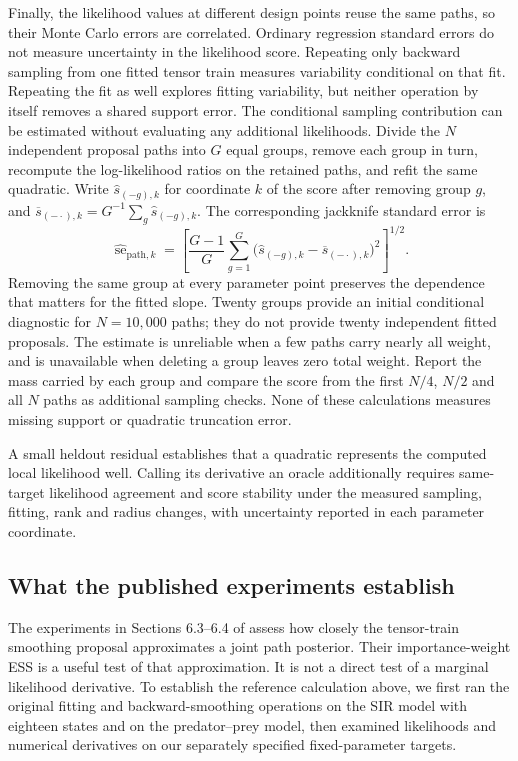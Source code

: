 Finally, the likelihood values at different design points reuse the same
paths, so their Monte Carlo errors are correlated.  Ordinary regression
standard errors do not measure uncertainty in the likelihood score.  Repeating
only backward sampling from one fitted tensor train measures variability
conditional on that fit.  Repeating the fit as well explores fitting
variability, but neither operation by itself removes a shared support error.
The conditional sampling contribution can be estimated without evaluating
any additional likelihoods.  Divide the $N$ independent proposal paths into
$G$ equal groups, remove each group in turn, recompute the log-likelihood
ratios on the retained paths, and refit the same quadratic.  Write
$\widehat s_{(-g),k}$ for coordinate $k$ of the score after removing group $g$,
and $\overline s_{(-\cdot),k}=G^{-1}\sum_g\widehat s_{(-g),k}$.  The
corresponding jackknife standard error is
\begin{equation}
  \widehat{\operatorname{se}}_{\mathrm{path},k}
  =\left[\frac{G-1}{G}\sum_{g=1}^{G}
    \bigl(\widehat s_{(-g),k}-\overline s_{(-\cdot),k}\bigr)^2
    \right]^{1/2}.
  \label{eq:bf-hd-reference-jackknife}
\end{equation}
Removing the same group at every parameter point preserves the dependence
that matters for the fitted slope.  Twenty groups provide an initial
conditional diagnostic for $N=10{,}000$ paths; they do not provide twenty
independent fitted proposals.  The estimate is unreliable when a few paths
carry nearly all weight, and is unavailable when deleting a group leaves
zero total weight.  Report the mass carried by each group and compare the
score from the first $N/4$, $N/2$ and all $N$ paths as additional sampling
checks.  None of these calculations measures missing support or quadratic
truncation error.

A small heldout residual establishes that a quadratic represents the computed
local likelihood well.  Calling its derivative an oracle additionally requires
same-target likelihood agreement and score stability under the measured
sampling, fitting, rank and radius changes, with uncertainty reported in each
parameter coordinate.

\subsection{What the published experiments establish}
\label{sec:bf-hd-reference-replication}

The experiments in Sections 6.3--6.4 of
\citet{zhao2024ttsequential} assess how closely the tensor-train smoothing
proposal approximates a joint path posterior.  Their importance-weight ESS
is a useful test of that approximation.  It is not a direct test of a marginal
likelihood derivative.  To establish the reference calculation above, we first
ran the original fitting and backward-smoothing operations on the SIR model
with eighteen states and on the predator--prey model, then examined likelihoods
and numerical derivatives on our separately specified fixed-parameter targets.


